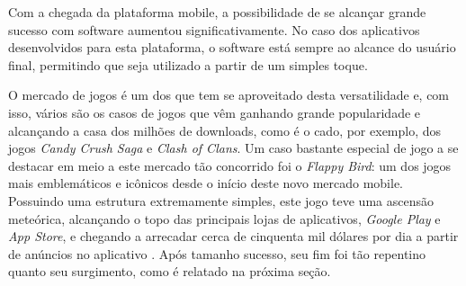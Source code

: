 Com a chegada da plataforma mobile, a possibilidade de se alcançar grande sucesso com software aumentou significativamente. No caso dos aplicativos desenvolvidos para esta plataforma, o software está sempre ao alcance do usuário final, permitindo que seja utilizado a partir de um simples toque.

O mercado de jogos é um dos que tem se aproveitado desta versatilidade e, com isso, vários são os casos de jogos que vêm ganhando grande popularidade e alcançando a casa dos milhões de downloads, como é o cado, por exemplo, dos jogos \textit{Candy Crush Saga} e \textit{Clash of Clans}. Um caso bastante especial de jogo a se destacar em meio a este mercado tão concorrido foi o \textit{Flappy Bird}: um dos jogos mais emblemáticos e icônicos desde o início deste novo mercado mobile. Possuindo uma estrutura extremamente simples, este jogo teve uma ascensão meteórica, alcançando o topo das principais lojas de aplicativos, \textit{Google Play} e \textit{App Store}, e chegando a arrecadar cerca de cinquenta mil dólares por dia a partir de anúncios no aplicativo \cite{Warren2014}. Após tamanho sucesso, seu fim foi tão repentino quanto seu surgimento, como é relatado na próxima seção.




